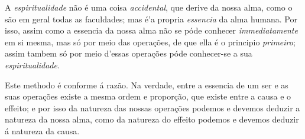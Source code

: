 
A \emph{espiritualidade} não é uma coisa \emph{accidental}, que derive da nossa alma, como o são em geral todas as faculdades; mas é'a propria \emph{essencia} da alma humana. Por isso, assim como a essencia da nossa alma não se póde conhecer \emph{immediatamente} em si mesma, mas só por meio das operações, de que ella é o principio \emph{primeiro}; assim tambem só por meio d'essas operações póde conhecer-se a sua \emph{espiritualidade}.

Este methodo é conforme á razão. Na verdade, entre a essencia de um ser e as suas operações existe a mesma ordem e proporção, que existe entre a causa e o effeito; e por isso da natureza das nossas operações podemos e devemos deduzir a natureza da nossa alma, como da natureza do effeito podemos e devemos deduzir á natureza da causa.

